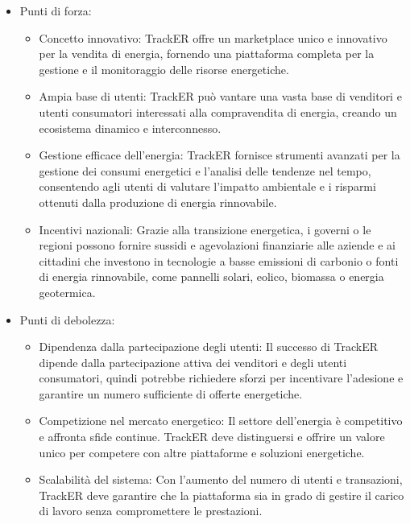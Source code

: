 \documentclass[oneside]{book}
\begin{document}
\begin{itemize}
    \item Punti di forza:
        \begin{itemize}
            \item Concetto innovativo: TrackER offre un marketplace unico e innovativo per la vendita di energia, fornendo una piattaforma completa per la gestione e il monitoraggio delle risorse energetiche.
            \item Ampia base di utenti: TrackER può vantare una vasta base di venditori e utenti consumatori interessati alla compravendita di energia, creando un ecosistema dinamico e interconnesso.
            \item Gestione efficace dell'energia: TrackER fornisce strumenti avanzati per la gestione dei consumi energetici e l'analisi delle tendenze nel tempo, consentendo agli utenti di valutare l'impatto ambientale e i risparmi ottenuti dalla produzione di energia rinnovabile.
            \item Incentivi nazionali: Grazie alla transizione energetica, i governi o le regioni possono fornire sussidi e agevolazioni finanziarie alle aziende e ai cittadini che investono in tecnologie a basse emissioni di carbonio o fonti di energia rinnovabile, come pannelli solari, eolico, biomassa o energia geotermica.
        \end{itemize}
\end{itemize}

\begin{itemize}
    \item Punti di debolezza:
        \begin{itemize}
            \item Dipendenza dalla partecipazione degli utenti: Il successo di TrackER dipende dalla partecipazione attiva dei venditori e degli utenti consumatori, quindi potrebbe richiedere sforzi per incentivare l'adesione e garantire un numero sufficiente di offerte energetiche.
            \item Competizione nel mercato energetico: Il settore dell'energia è competitivo e affronta sfide continue. TrackER deve distinguersi e offrire un valore unico per competere con altre piattaforme e soluzioni energetiche.
            \item Scalabilità del sistema: Con l'aumento del numero di utenti e transazioni, TrackER deve garantire che la piattaforma sia in grado di gestire il carico di lavoro senza compromettere le prestazioni.
        \end{itemize}
\end{itemize}
\end{document}
